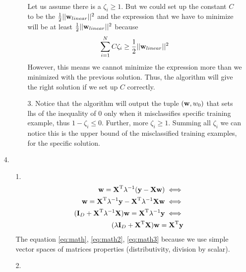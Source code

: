 \documentclass[10pt,a4paper]{article}
\begin{document}
\begin{enumerate}
\begin{enumerate}
\begin{enumerate}
\\ Let us assume there is a $\zeta_i \geq 1$. But we could set up the constant $C$ to be the $\frac{1}{2}||\textbf{\text{{w}}}_{linear}||^2$ and the expression that we have to minimize will be at least $\frac{1}{2}||\textbf{\text{{w}}}_{linear}||^2$ because $$\sum_{i=1}^N C \zeta_i \geq  \frac{1}{2}||\textbf{\text{{w}}}_{linear}||^2$$ However, this means we cannot minimize the expression more than we minimized with the previous solution. Thus, the algorithm will give the right solution if we set up $C$ correctly.
\item[3.]
Notice that the algorithm will output the tuple $(\textbf{\text{{w}}}, w_0)$ that sets lhs of the inequality of $0$ only when it misclassifies specific training example, thus $1-\zeta_i \leq 0$. Further, more $\zeta_i \geq 1$. Summing all $\zeta_i$ we can notice this is the upper bound of the misclassified training examples, for the specific solution. 

\end{enumerate}
\end{enumerate}
\item[4.]
\begin{enumerate}
\item[1.]
\begin{align}
\textbf{\text{{w}}}=\textbf{\text{{X}}} ^ \text{T}\lambda^{-1}(\textbf{\text{{y}}}-\textbf{\text{{X}}}\textbf{\text{{w}}}) \nonumber\iff\\
\textbf{\text{{w}}}=\textbf{\text{{X}}} ^ \text{T}\lambda^{-1}\textbf{\text{{y}}}-
\textbf{\text{{X}}} ^ \text{T}\lambda^{-1}\textbf{\text{{X}}}\textbf{\text{{w}}} \iff \label{eq:math}\\
(\textbf{\text{{I}}}_D + \textbf{\text{{X}}} ^ \text{T}\lambda^{-1}\textbf{\text{{X}}})\textbf{\text{{w}}}=\textbf{\text{{X}}} ^ \text{T}\lambda^{-1}\textbf{\text{{y}}} \label{eq:math2}\iff \\
(\lambda\textbf{\text{{I}}}_D + \textbf{\text{{X}}} ^ \text{T}\textbf{\text{{X}}})\textbf{\text{{w}}}=\textbf{\text{{X}}} ^ \text{T}\textbf{\text{{y}}}\label{eq:math3}
\end{align}
The equation \ref{eq:math}, \ref{eq:math2}, \ref{eq:math3} because we use simple vector spaces of matrices properties (distributivity, division by scalar).
\item[2.]


\end{enumerate}
\end{enumerate}
\end{document}
